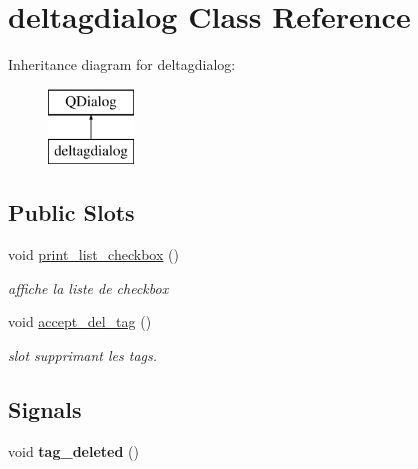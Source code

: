 \hypertarget{classdeltagdialog}{\section{deltagdialog Class Reference}
\label{classdeltagdialog}
}
Inheritance diagram for deltagdialog\-:\begin{figure}[H]
\begin{center}
\leavevmode
\includegraphics[height=2.000000cm]{classdeltagdialog}
\end{center}
\end{figure}
\subsection*{Public Slots}
\begin{DoxyCompactItemize}
\item 
\hypertarget{classdeltagdialog_ab221c23d6e90da92e9944ac3a885c504}{void \hyperlink{classdeltagdialog_ab221c23d6e90da92e9944ac3a885c504}{print\-\_\-list\-\_\-checkbox} ()}\label{classdeltagdialog_ab221c23d6e90da92e9944ac3a885c504}

\begin{DoxyCompactList}\small\item\em affiche la liste de checkbox \end{DoxyCompactList}\item 
\hypertarget{classdeltagdialog_a43da5e859752a49256dce0337ff1b9d1}{void \hyperlink{classdeltagdialog_a43da5e859752a49256dce0337ff1b9d1}{accept\-\_\-del\-\_\-tag} ()}\label{classdeltagdialog_a43da5e859752a49256dce0337ff1b9d1}

\begin{DoxyCompactList}\small\item\em slot supprimant les tags. \end{DoxyCompactList}\end{DoxyCompactItemize}
\subsection*{Signals}
\begin{DoxyCompactItemize}
\item 
\hypertarget{classdeltagdialog_aec21287cbed72964487a26ecd9d56264}{void {\bfseries tag\-\_\-deleted} ()}\label{classdeltagdialog_aec21287cbed72964487a26ecd9d56264}

\end{DoxyCompactItemize}
